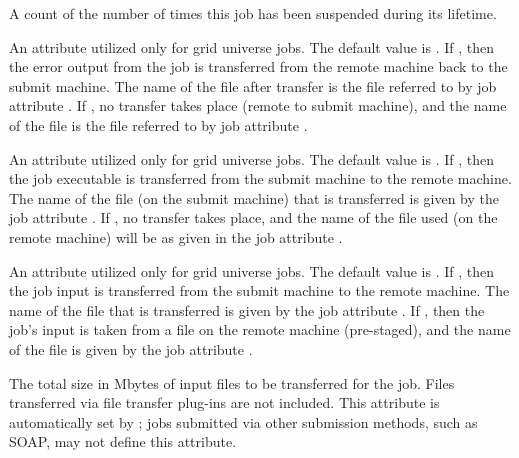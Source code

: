 \begin{description}
\item[\AdAttr{TotalSuspensions}:]  A count of the number of times this job
has been suspended during its lifetime.

\item[\AdAttr{TransferErr}:]   
An attribute utilized only for grid universe jobs.
The default value is .
If , then the error output from the job
is transferred from the remote machine back to the submit machine.
The name of the file after transfer is the file referred to
by job attribute .
If , no transfer takes place (remote to submit machine),
and the name of the file is the file referred to
by job attribute .

\item[\AdAttr{TransferExecutable}:]   
An attribute utilized only for grid universe jobs.
The default value is .
If , then the job executable is transferred from the submit
machine to the remote machine.
The name of the file (on the submit machine)
that is transferred is given by the
job attribute .
If , no transfer takes place, and
the name of the file used (on the remote machine) will be as
given in the job attribute .

\item[\AdAttr{TransferIn}:]   
An attribute utilized only for grid universe jobs.
The default value is .
If , then the job input is transferred from the submit
machine to the remote machine.
The name of the file that is transferred is given by the
job attribute .
If , then the job's input is taken from a file on the
remote machine (pre-staged), and 
the name of the file is given by the job attribute .

\item[\AdAttr{TransferInputSizeMB}:]
The total size in Mbytes of input files to be transferred for the
job.  Files transferred via file transfer plug-ins are not included.
This attribute is automatically set by ; jobs submitted
via other submission methods, such as SOAP, may not define this
attribute.


\end{description}
